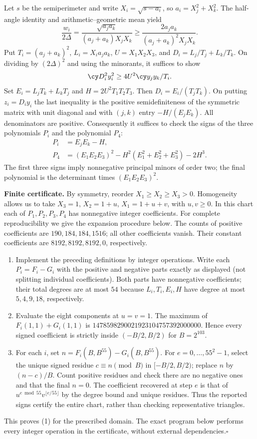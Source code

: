 \documentclass[11pt,a4paper]{article}
\numberwithin{equation}{section}
\theoremstyle{definition}
\theoremstyle{remark}
\begin{document}
Let $s$ be the semiperimeter and write $X_i=\sqrt{s-a_i}$, so $a_i=X_j^2+X_k^2$. The half-angle identity and arithmetic--geometric mean yield
\[
 \frac{w_i}{2\Delta}
 =\frac{\sqrt{a_ja_k}}{(a_j+a_k)X_jX_k}
 \ge\frac{2a_ja_k}{(a_j+a_k)^2X_jX_k}.
\]
Put $T_i=(a_j+a_k)^2$, $L_i=X_i a_ja_k$, $U=X_1X_2X_3$, and $D_i=L_j/T_j+L_k/T_k$. On dividing by $(2\Delta)^2$ and using the minorants, it suffices to show
\[
 \cy D_i^2 y_i^2\ge 4U^2\cy y_jy_k/T_i .
\]
Set $E_i=L_jT_k+L_kT_j$ and $H=2U^2T_1T_2T_3$. Then $D_i=E_i/(T_jT_k)$. On putting $z_i=D_i y_i$ the last inequality is the positive semidefiniteness of the symmetric matrix with unit diagonal and with $(j,k)$ entry $-H/(E_jE_k)$. All denominators are positive. Consequently it suffices to check the signs of the three polynomials $P_i$ and the polynomial $P_4$:
\begin{align*}
 P_i &= E_jE_k-H,\\
 P_4 &= (E_1E_2E_3)^2-H^2(E_1^2+E_2^2+E_3^2)-2H^3 .
\end{align*}
The first three signs imply nonnegative principal minors of order two; the final polynomial is the determinant times $(E_1E_2E_3)^2$.

\textbf{Finite certificate.} By symmetry, reorder $X_1\ge X_2\ge X_3>0$. Homogeneity allows us to take $X_3=1$, $X_2=1+u$, $X_1=1+u+v$, with $u,v\ge0$. In this chart each of $P_1,P_2,P_3,P_4$ has nonnegative integer coefficients. For complete reproducibility we give the expansion procedure below. The counts of positive coefficients are $190,184,184,1516$; all other coefficients vanish. Their constant coefficients are $8192,8192,8192,0$, respectively.
\begin{enumerate}
\item Implement the preceding definitions by integer operations. Write each $P_i=F_i-G_i$ with the positive and negative parts exactly as displayed (not splitting individual coefficients). Both parts have nonnegative coefficients; their total degrees are at most $54$ because $L_i,T_i,E_i,H$ have degree at most $5,4,9,18$, respectively.
\item Evaluate the eight components at $u=v=1$. The maximum of $F_i(1,1)+G_i(1,1)$ is $1478598290021923104757392000000$. Hence every signed coefficient is strictly inside $(-B/2,B/2)$ for $B=2^{103}$.
\item For each $i$, set $n=F_i(B,B^{55})-G_i(B,B^{55})$. For $e=0,\ldots,55^2-1$, select the unique signed residue $c\equiv n\pmod B$ in $[-B/2,B/2)$; replace $n$ by $(n-c)/B$. Count positive residues and check there are no negative ones and that the final $n=0$. The coefficient recovered at step $e$ is that of $u^{e\bmod55}v^{\lfloor e/55\rfloor}$ by the degree bound and unique residues. Thus the reported signs certify the entire chart, rather than checking representative triangles.
\end{enumerate}
This proves (1) for the prescribed domain. The exact program below performs every integer operation in the certificate, without external dependencies.\hfill$\square$
\end{document}
